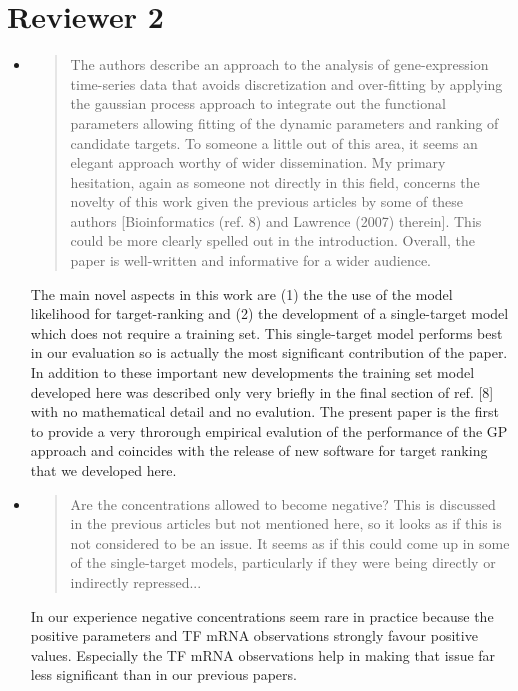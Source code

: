 \documentclass{article}
\begin{document}
\newpage

\section*{Reviewer 2}

\begin{itemize}
\item \begin{quote} The authors describe an approach to the analysis
    of gene-expression time-series data that avoids discretization and
    over-fitting by applying the gaussian process approach to
    integrate out the functional parameters allowing fitting of the
    dynamic parameters and ranking of candidate targets. To someone a
    little out of this area, it seems an elegant approach worthy of
    wider dissemination. My primary hesitation, again as someone not
    directly in this field, concerns the novelty of this work given
    the previous articles by some of these authors [Bioinformatics
    (ref. 8) and Lawrence (2007) therein]. This could be more clearly
    spelled out in the introduction. Overall, the paper is
    well-written and informative for a wider audience.
\end{quote}

The main novel aspects in this work are (1) the the use of the model likelihood
for target-ranking and (2) the development of a single-target model which
does not require a training set. This single-target model performs
best in our evaluation so is actually the most significant
contribution of the paper. In addition to these important new
developments the training set model developed here was described only
very briefly in the final section of ref. [8] with no
mathematical detail and no evalution. The present paper is the first to
provide a very throrough empirical evalution of the performance of the
GP approach and coincides with the release of new software for
target ranking that we developed here. 

\item \begin{quote} Are the concentrations allowed to become negative?
    This is discussed in the previous articles but not mentioned here,
    so it looks as if this is not considered to be an issue. It seems
    as if this could come up in some of the single-target models,
    particularly if they were being directly or indirectly
    repressed...
\end{quote}

In our experience negative concentrations seem rare in practice
because the positive parameters and TF mRNA observations strongly
favour positive values.  Especially the TF mRNA observations help in
making that issue far less significant than in our previous papers.


\end{itemize}
\end{document}
